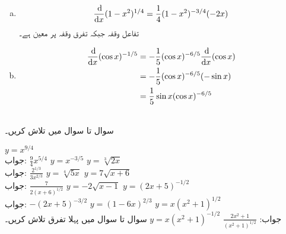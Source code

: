 \begin{enumerate}[a.]

\item
\begin{align*}
\frac{\dif}{\dif x}(1-x^2)^{1/4}=\frac{1}{4}(1-x^2)^{-3/4}(-2x)
\end{align*}
تفاعل وقفہ  جبکہ تفرق وقفہ  پر معین ہے۔
\item
\begin{align*}
\frac{\dif}{\dif x}(\cos x)^{-1/5}&=-\frac{1}{5}(\cos x)^{-6/5}\frac{\dif}{\dif x} (\cos x)\\
&=-\frac{1}{5}(\cos x)^{-6/5}(-\sin x)\\
&=\frac{1}{5}\sin x(\cos x)^{-6/5}
\end{align*}
\end{enumerate}

\\
سوال  تا سوال  میں  تلاش کریں۔

$y=x^{9/4}$\\
جواب:\quad
$\tfrac{9}{4}x^{5/4}$
$y=x^{-3/5}$
$y=\sqrt[3]{2x}$\\
جواب:\quad
$\tfrac{2^{1/3}}{3x^{2/3}}$
$y=\sqrt[4]{5x}$
$y=7\sqrt{x+6}$\\
جواب:\quad
$\tfrac{7}{2(x+6)^{1/2}}$
$y=-2\sqrt{x-1}$
$y=(2x+5)^{-1/2}$\\
جواب:\quad
$-(2x+5)^{-3/2}$
$y=(1-6x)^{2/3}$
$y=x(x^2+1)^{1/2}$\\
جواب:\quad
$\tfrac{2x^2+1}{(x^2+1)^{1/2}}$
$y=x(x^2+1)^{-1/2}$
سوال  تا سوال  میں پہلا تفرق تلاش کریں۔

